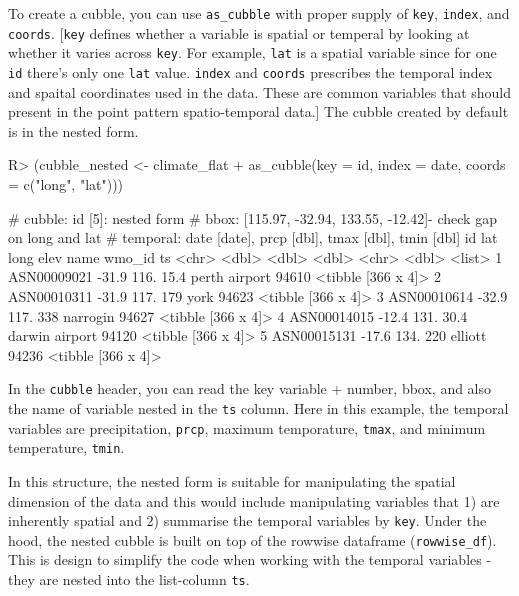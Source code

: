 \documentclass[
]{jss}
\begin{document}
To create a cubble, you can use \texttt{as\_cubble} with proper supply
of \texttt{key}, \texttt{index}, and \texttt{coords}. {[}\texttt{key}
defines whether a variable is spatial or temperal by looking at whether
it varies across \texttt{key}. For example, \texttt{lat} is a spatial
variable since for one \texttt{id} there's only one \texttt{lat} value.
\texttt{index} and \texttt{coords} prescribes the temporal index and
spaital coordinates used in the data. These are common variables that
should present in the point pattern spatio-temporal data.{]} The cubble
created by default is in the nested form. \newline

\begin{CodeChunk}
\begin{CodeInput}
R> (cubble_nested <- climate_flat %
+   as_cubble(key = id, index = date, coords = c("long", "lat")))
\end{CodeInput}
\begin{CodeOutput}
# cubble:   id [5]: nested form
# bbox:     [115.97, -32.94, 133.55, -12.42]- check gap on long and lat
# temporal: date [date], prcp [dbl], tmax [dbl], tmin [dbl]
  id            lat  long  elev name           wmo_id ts                
  <chr>       <dbl> <dbl> <dbl> <chr>           <dbl> <list>            
1 ASN00009021 -31.9  116.  15.4 perth airport   94610 <tibble [366 x 4]>
2 ASN00010311 -31.9  117. 179   york            94623 <tibble [366 x 4]>
3 ASN00010614 -32.9  117. 338   narrogin        94627 <tibble [366 x 4]>
4 ASN00014015 -12.4  131.  30.4 darwin airport  94120 <tibble [366 x 4]>
5 ASN00015131 -17.6  134. 220   elliott         94236 <tibble [366 x 4]>
\end{CodeOutput}
\end{CodeChunk}

In the \texttt{cubble} header, you can read the key variable + number,
bbox, and also the name of variable nested in the \texttt{ts} column.
Here in this example, the temporal variables are precipitation,
\texttt{prcp}, maximum temporature, \texttt{tmax}, and minimum
temperature, \texttt{tmin}.

In this structure, the nested form is suitable for manipulating the
spatial dimension of the data and this would include manipulating
variables that 1) are inherently spatial and 2) summarise the temporal
variables by \texttt{key}. Under the hood, the nested cubble is built on
top of the rowwise dataframe (\texttt{rowwise\_df}). This is design to
simplify the code when working with the temporal variables - they are
nested into the list-column \texttt{ts}.
\end{document}
